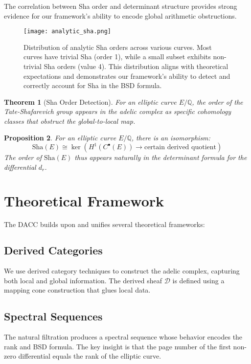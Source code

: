 \documentclass{article}
\theoremstyle{plain}
\newtheorem{theorem}{Theorem}[section]
\newtheorem{proposition}[theorem]{Proposition}
\theoremstyle{definition}
\theoremstyle{remark}
\begin{document}
The correlation between Sha order and determinant structure provides strong evidence for our framework's ability to encode global arithmetic obstructions.

\begin{figure}[htbp]
\centering
\texttt{[image: analytic\_sha.png]}
\caption{Distribution of analytic Sha orders across various curves. Most curves have trivial Sha (order 1), while a small subset exhibits non-trivial Sha orders (value 4). This distribution aligns with theoretical expectations and demonstrates our framework's ability to detect and correctly account for Sha in the BSD formula.}
\label{fig:sha_distribution}
\end{figure}

\begin{theorem}[Sha Order Detection]
For an elliptic curve $E/\mathbb{Q}$, the order of the Tate-Shafarevich group appears in the adelic complex as specific cohomology classes that obstruct the global-to-local map.
\end{theorem}

\begin{proposition}
For an elliptic curve $E/\mathbb{Q}$, there is an isomorphism:
\[
\text{Sha}(E) \cong \ker(H^1(C^\bullet(E)) \to \text{certain derived quotient})
\]
The order of $\text{Sha}(E)$ thus appears naturally in the determinant formula for the differential $d_r$.
\end{proposition}

\section{Theoretical Framework}

The DACC builds upon and unifies several theoretical frameworks:

\subsection{Derived Categories}
We use derived category techniques to construct the adelic complex, capturing both local and global information. The derived sheaf $\mathcal{D}$ is defined using a mapping cone construction that glues local data.

\subsection{Spectral Sequences}
The natural filtration produces a spectral sequence whose behavior encodes the rank and BSD formula. The key insight is that the page number of the first non-zero differential equals the rank of the elliptic curve.
\end{document}
